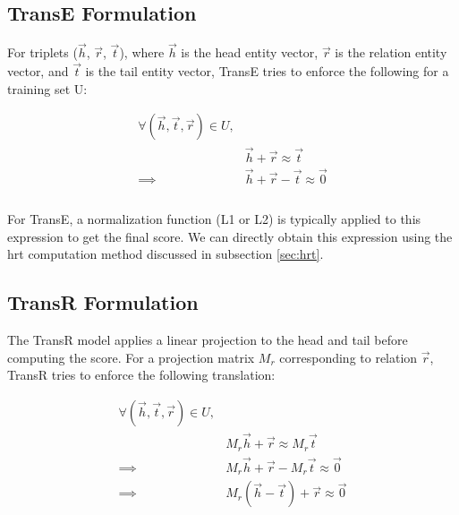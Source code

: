 \subsection{TransE Formulation}
\label{transe_formulation}
For triplets ($\Vec{h}$, $\Vec{r}$, $\Vec{t}$), where $\Vec{h}$ is the head entity vector, $\Vec{r}$ is the relation entity vector, and $\Vec{t}$ is the tail entity vector, TransE tries to enforce the following for a training set U:
\begin{spacing}{0.2}
\begin{equation} \label{eq1}
\begin{split}
    \forall ( \Vec{h}, \Vec{t}, \Vec{r}) \in U, & \\
     & \Vec{h} + \Vec{r} \approx \Vec{t} \\
     \implies & \Vec{h} + \Vec{r} - \Vec{t}\approx \Vec{0} \\ \\
    \end{split}
\end{equation}
\end{spacing}
For TransE, a normalization function (L1 or L2) is typically applied to this expression to get the final score. We can directly obtain this expression using the hrt computation method discussed in subsection \ref{sec:hrt}.

\subsection{TransR Formulation}
\label{transr_formulation}
The TransR model applies a linear projection to the head and tail before computing the score. For a projection matrix $M_r$ corresponding to relation $\Vec{r}$, TransR tries to enforce the following translation:

\begin{spacing}{0.2}
\begin{equation} \label{eq2}
\begin{split}
    \forall ( \Vec{h}, \Vec{t}, \Vec{r}) \in U, & \\
     & M_r\Vec{h} + \Vec{r} \approx M_r\Vec{t} \\
     \implies & M_r\Vec{h} + \Vec{r} - M_r\Vec{t}\approx \Vec{0} \\
     \implies & M_r(\Vec{h} - \Vec{t})+ \Vec{r}\approx \Vec{0} \\
     \\
    \end{split}
\end{equation}
\end{spacing}

